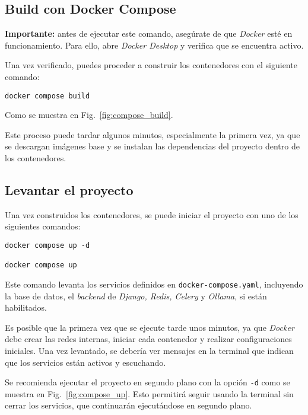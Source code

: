 
\subsection{Build con Docker Compose}

\textbf{Importante:} antes de ejecutar este comando, asegúrate de que \textit{Docker} esté en funcionamiento. 
Para ello, abre \textit{Docker Desktop} y verifica que se encuentra activo.

Una vez verificado, puedes proceder a construir los contenedores con el siguiente comando:

\begin{verbatim}
docker compose build
\end{verbatim}
Como se muestra en Fig.~\ref{fig:compose_build}.

Este proceso puede tardar algunos minutos, especialmente la primera vez, ya que se descargan 
imágenes base y se instalan las dependencias del proyecto dentro de los contenedores.

\subsection{Levantar el proyecto}

Una vez construidos los contenedores, se puede iniciar el proyecto con uno de los siguientes comandos:

\begin{verbatim}
docker compose up -d

docker compose up
\end{verbatim}

Este comando levanta los servicios definidos en \texttt{docker-compose.yaml}, incluyendo la base de datos, el \textit{backend} de \textit{Django, Redis, Celery} y \textit{Ollama}, si están habilitados. 

Es posible que la primera vez que se ejecute tarde unos minutos, ya que \textit{Docker} debe crear las redes internas, iniciar cada contenedor y realizar configuraciones iniciales. Una vez levantado, se debería ver mensajes en la terminal que indican que los servicios están activos y escuchando.

Se recomienda ejecutar el proyecto en segundo plano con la opción \texttt{-d} como se muestra en Fig.~\ref{fig:compose_up}.
Esto permitirá seguir usando la terminal sin cerrar los servicios, que continuarán ejecutándose en segundo plano.

